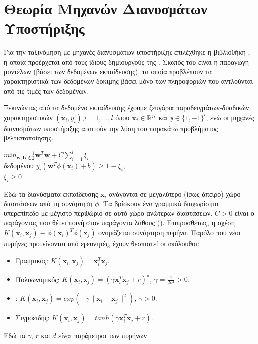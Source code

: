 \section{Θεωρία Μηχανών Διανυσμάτων Υποστήριξης}
Για την ταξινόμηση με μηχανές διανυσμάτων υποστήριξης επιλέχθηκε η βιβλιοθήκη , η οποία προέρχεται από τους ίδιους δημιουργούς της . Σκοπός του  είναι η παραγωγή μοντέλων (βάσει των δεδομένων εκπαίδευσης), τα οποία προβλέπουν τα χαρακτηριστικά των δεδομένων δοκιμής βάσει μόνο των πληροφοριών που αντλούνται από τις τιμές των δεδομένων.\par
Ξεκινώντας από τα δεδομένα εκπαίδευσης έχουμε ζευγάρια παραδειγμάτων-δυαδικών χαρακτηριστικών $(\mathbf{x}_i,y_i)$,$i=1,...,l$ όπου $\mathbf{x}_i\in\mathbb{R}^n$ και $y\in\{1,-1\}^l$, ενώ οι μηχανές διανυσμάτων υποστήριξης  απαιτούν την λύση του παρακάτω προβλήματος βελτιστοποίησης:
\begin{center}
$min_{\mathbf{w},\mathbf{b},\mathbf{\xi}} \frac{1}{2}\mathbf{w}^T\mathbf{w}+C\sum_{i=1}^l\xi_i$\\
δεδομένου $y_i(\mathbf{w}^T\phi(\mathbf{x}_i)+b)\geq 1-\xi_i$,\\
$\xi_i \geq 0$
\end{center}
\par Εδώ τα διανύσματα εκπαίδευσης $\mathbf{x}_i$ ανάγονται σε μεγαλύτερο (ίσως άπειρο) χώρο διαστάσεων από τη συνάρτηση $\phi$. Τα  βρίσκουν ένα γραμμικά διαχωρίσιμο υπερεπίπεδο με μέγιστο περιθώριο σε αυτό χώρο ανώτερων διαστάσεων. $C>0$ είναι ο παράγοντας που θέτει ποινή στον παράγοντα λάθους (). Επιπροσθέτως, η σχέση $K(\mathbf{x}_i,\mathbf{x}_j)\equiv \phi(\mathbf{x}_i)^T\phi(\mathbf{x}_j)$ ονομάζεται συνάρτηση πυρήνα. Παρόλο που νέοι πυρήνες προτείνονται από ερευνητές, έχουν θεσπιστεί οι ακόλουθοι:
\begin{itemize}
\item Γραμμικός: $K(\mathbf{x}_i,\mathbf{x}_j)= \mathbf{x}_i^T\mathbf{x}_j$.
\item Πολυωνυμικός: $K(\mathbf{x}_i,\mathbf{x}_j)= (\gamma\mathbf{x}_i^T\mathbf{x}_j+r)^d$, $\gamma=\frac{1}{2\sigma^2}>0$.
\item {}: $K(\mathbf{x}_i,\mathbf{x}_j)= exp(-\gamma\|\mathbf{x}_i-\mathbf{x}_j\|^2)$, $\gamma>0$.
\item Σιγμοειδής: $K(\mathbf{x}_i,\mathbf{x}_j)= tanh(\gamma\mathbf{x}_i^T\mathbf{x}_j +r)$.
\end{itemize}
Εδώ τα $\gamma$, $r$ και $d$ είναι παράμετροι των πυρήνων \cite{libsvmguide}.\par
